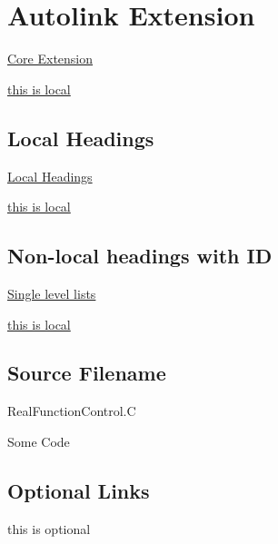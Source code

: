 
\chapter{\label{autolink-extension}Autolink Extension}
\par \hyperref[core-extension]{Core Extension}
\par \hyperref[core-extension]{this is local}
\section{\label{local-headings}Local Headings}
\par \hyperref[local-headings]{Local Headings}
\par \hyperref[local-headings]{this is local}
\section{\label{non-local-headings-with-id}Non-local headings with ID}
\par \hyperref[ordered-single-level-lists]{Single level lists}
\par \hyperref[unordered-single-level-lists]{this is local}
\section{\label{source-filename}Source Filename}
\par RealFunctionControl.C
\par Some Code
\section{\label{optional-links}Optional Links}
\par this is optional 